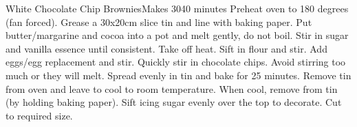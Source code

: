 \begin{recipe}{White Chocolate Chip Brownies}{Makes 30}{40 minutes}
Preheat oven to 180 degrees (fan forced).
Grease a 30x20cm slice tin and line with baking paper.
Put butter/margarine and cocoa into a pot and melt gently, do not boil.
Stir in sugar and vanilla essence until consistent.
Take off heat.
Sift in flour and stir.
Add eggs/egg replacement and stir.
Quickly stir in chocolate chips. Avoid stirring too much or they will melt.
Spread evenly in tin and bake for 25 minutes.
Remove tin from oven and leave to cool to room temperature.
When cool, remove from tin (by holding baking paper).
Sift icing sugar evenly over the top to decorate.
Cut to required size.
\end{recipe}
